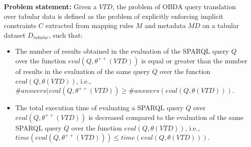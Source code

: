 \noindent\textbf{Problem statement:} Given a $VTD$, the problem of OBDA query translation over tabular data is defined as the problem of explicitly enforcing implicit constraints $C$ extracted from mapping rules $M$ and metadata $MD$ on a tabular dataset $D_{tabular}$, such that: 
\begin{itemize}
    \item The number of results obtained in the evaluation of the SPARQL query $Q$ over the function $eval(Q,\theta^{++}(VTD))$ is equal or greater than the number of results in the evaluation of the same query $Q$ over the function $eval(Q,\theta(VTD))$, i.e., $\#answers(eval(Q,\theta^{++}(VTD)) \geq \#answers(eval(Q,\theta(VTD)))$.
    \item The total execution time of evaluating a SPARQL query $Q$ over $eval(Q,\theta^{++}(VTD))$ is decreased compared to the evaluation of the same SPARQL query $Q$ over the function $eval(Q,\theta(VTD))$, i.e., $time(eval(Q,\theta^{++}(VTD))) \leq
    time(eval(Q,\theta(VTD)))$. 
\end{itemize}


